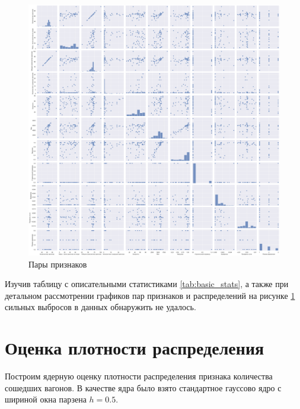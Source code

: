 \begin{figure}[H]
\begin{center}
\includegraphics[width=1.0\linewidth]{src/img/pair_plot.png}
\caption{Пары признаков}
\label{fig:pair_plot}
\end{center}
\end{figure}

Изучив таблицу с описательными статистиками \ref{tab:basic_stats}, а также при детальном рассмотрении графиков пар признаков и распределений на рисунке \ref{fig:pair_plot} сильных выбросов в данных обнаружить не удалось.



\section{Оценка плотности распределения}

Построим ядерную оценку плотности распределения признака количества сошедших вагонов. В качестве ядра было взято стандартное гауссово ядро с шириной окна парзена $h = 0.5$.

